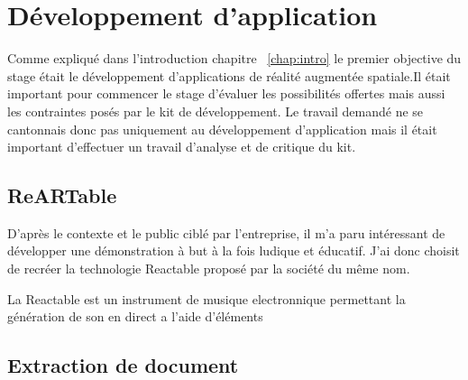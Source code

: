\chapter{Développement d'application}

Comme expliqué dans l'introduction chapitre ~\ref{chap:intro} le premier objective du stage était le développement d'applications de réalité augmentée spatiale.Il était important pour commencer le stage d'évaluer les possibilités offertes mais aussi les contraintes posés par le kit de développement. Le travail demandé ne se cantonnais donc pas uniquement au développement d'application mais il était important d'effectuer un travail d'analyse et de critique du kit.

\section{ReARTable}
D'après le contexte et le public ciblé par l'entreprise, il m'a paru intéressant de développer une démonstration à but à la fois ludique et éducatif. J'ai donc choisit de recréer la technologie Reactable\cite{reactable} proposé par la société du même nom.

La Reactable est un instrument de musique electronnique permettant la génération de son en direct a l'aide d'éléments


\section{Extraction de document}

